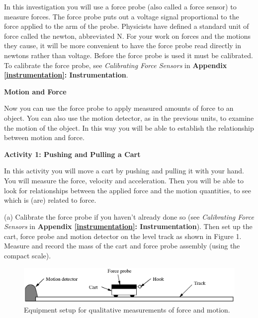 In this investigation you will use a force probe (also called a force sensor) to measure forces. The force probe puts out a voltage signal proportional to the force applied to the arm of the probe. Physicists have defined a standard unit of force called the newton, abbreviated N. For your work on forces and the motions they cause, it will be more convenient to have the force probe read directly in newtons rather than voltage. Before the force probe is used it must be calibrated. To calibrate the force probe, see \textit{Calibrating Force Sensors} in \textbf{Appendix \ref{instrumentation}: Instrumentation}.

\pagebreak[2]
\textbf{Motion and Force} 

Now you can use the force probe to apply measured amounts of force to an object.
You can also use the motion detector, as in the previous units, to examine the
motion of the object. In this way you will be able to establish the relationship
between motion and force.
\vspace{10mm}

\textbf{Activity 1: Pushing and Pulling a Cart} 

In this activity you will move a cart by pushing and pulling it with your hand.
You will measure the force, velocity and acceleration. Then you will be able
to look for relationships between the applied force and the motion quantities,
to see which is (are) related to force.

(a) Calibrate the force probe if you haven't already done so (see \textit{Calibrating Force Sensors} in \textbf{Appendix \ref{instrumentation}: Instrumentation}). Then set up the cart, force probe and motion detector on the level track as shown in Figure 1. Measure and record the mass of the cart and force probe assembly (using the compact scale).

\answerspace{15mm}

\begin{figure}[t]
{\par\centering \includegraphics{force1/force1_fig1.eps} \par}


\caption{Equipment setup for qualitative measurements of force and motion.}
\end{figure}


